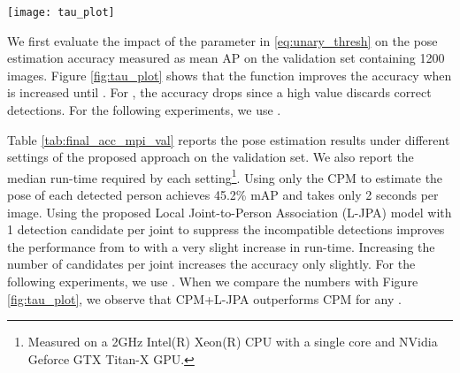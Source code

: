 \documentclass[runningheads]{llncs}
\begin{document}
\begin{figure*}[t!]
\centering
\captionsetup[figure]{skip=0pt}
\texttt{[image: tau\_plot]}
\caption{Impact of the parameter  in (\ref{eq:unary_thresh}) on the pose estimation accuracy.}
\label{fig:tau_plot}
\end{figure*}

We first evaluate the impact of the parameter  in  \eqref{eq:unary_thresh} on the pose estimation accuracy measured as mean AP on the validation set containing 1200 images. Figure \ref{fig:tau_plot} shows that the function  improves the accuracy when  is increased until . For , the accuracy drops since a high value discards correct detections. For the following experiments, we use .


\begin{table*}[t]
  \centering
  \footnotesize
  \setlength{\tabcolsep}{2.8pt} 
\def\arraystretch{1}

  \caption{Pose estimation results (AP) on the validation test set (1200 images) of the MPII Multi-Person Pose Dataset.}
\label{tab:final_acc_mpi_val}
\end{table*}

Table \ref{tab:final_acc_mpi_val} reports the pose estimation results under different settings of the proposed approach on the validation set. We also report the median run-time required by each setting\footnote{Measured on a 2GHz Intel(R) Xeon(R) CPU with a single core and NVidia Geforce GTX Titan-X GPU.}. Using only the CPM to estimate the pose of each detected person achieves 45.2\% mAP and takes only 2 seconds per image. Using the proposed Local Joint-to-Person Association (L-JPA) model with 1 detection candidate per joint  to suppress the incompatible detections improves the performance from  to  with a very slight increase in run-time. Increasing the number of candidates per joint increases the accuracy only slightly. For the following experiments, we use . When we compare the numbers with Figure \ref{fig:tau_plot}, we observe that CPM+L-JPA outperforms CPM for any .
\end{document}
